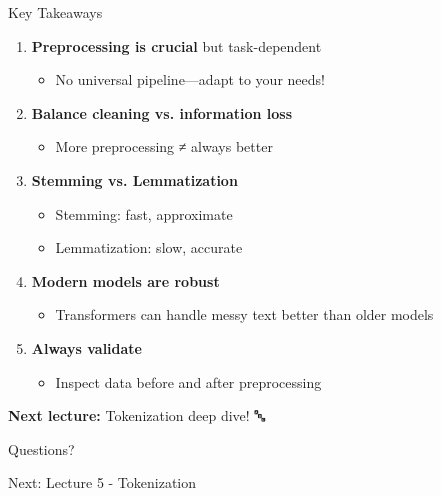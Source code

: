 \documentclass[aspectratio=169]{beamer}
\begin{document}
\begin{frame}[shrink=10]{Key Takeaways 🎯}
    \begin{enumerate}\setlength{\itemsep}{0pt}
        \item \textbf{Preprocessing is crucial} but task-dependent
        \begin{itemize}\setlength{\itemsep}{0pt}
            \item No universal pipeline—adapt to your needs!
        \end{itemize}

        \item \textbf{Balance cleaning vs. information loss}
        \begin{itemize}\setlength{\itemsep}{0pt}
            \item More preprocessing ≠ always better
        \end{itemize}

        \item \textbf{Stemming vs. Lemmatization}
        \begin{itemize}\setlength{\itemsep}{0pt}
            \item Stemming: fast, approximate
            \item Lemmatization: slow, accurate
        \end{itemize}

        \item \textbf{Modern models are robust}
        \begin{itemize}\setlength{\itemsep}{0pt}
            \item Transformers can handle messy text better than older models
        \end{itemize}

        \item \textbf{Always validate}
        \begin{itemize}\setlength{\itemsep}{0pt}
            \item Inspect data before and after preprocessing
        \end{itemize}
    \end{enumerate}

    \vspace{1em}
    \textbf{Next lecture:} Tokenization deep dive! 🔤
\end{frame}

\begin{frame}[standout]
    Questions? 🤔

    \vspace{1em}

    \normalsize
    Next: Lecture 5 - Tokenization
\end{frame}
\end{document}
